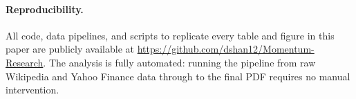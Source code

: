 \documentclass[11pt]{article}
\begin{document}
\paragraph{Reproducibility.}
All code, data pipelines, and scripts to replicate every table and figure in this paper
are publicly available at \url{https://github.com/dshan12/Momentum-Research}. The
analysis is fully automated: running the pipeline from raw Wikipedia and Yahoo Finance
data through to the final PDF requires no manual intervention.



\end{document}

